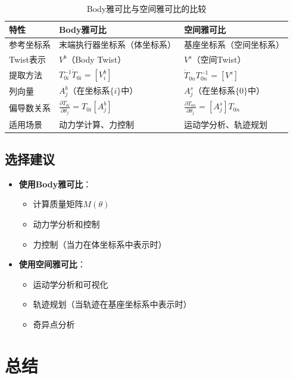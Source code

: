 \documentclass[12pt,a4paper]{article}
\begin{document}
\begin{table}[h]
\centering
\begin{tabular}{|l|l|l|}
\hline
\textbf{特性} & \textbf{Body雅可比} & \textbf{空间雅可比} \\
\hline
参考坐标系 & 末端执行器坐标系（体坐标系） & 基座坐标系（空间坐标系） \\
\hline
Twist表示 & $V^b$（Body Twist） & $V^s$（空间Twist） \\
\hline
提取方法 & $T_{0i}^{-1}\dot{T}_{0i} = [V_i^b]$ & $\dot{T}_{0n} T_{0n}^{-1} = [V^s]$ \\
\hline
列向量 & $A_j^b$（在坐标系$\{i\}$中） & $A_j^s$（在坐标系$\{0\}$中） \\
\hline
偏导数关系 & $\frac{\partial T_{0i}}{\partial \theta_j} = T_{0i} [A_j^b]$ & $\frac{\partial T_{0n}}{\partial \theta_j} = [A_j^s] T_{0n}$ \\
\hline
适用场景 & 动力学计算、力控制 & 运动学分析、轨迹规划 \\
\hline
\end{tabular}
\caption{Body雅可比与空间雅可比的比较}
\label{tab:comparison}
\end{table}

\subsection{选择建议}

\begin{itemize}
\item \textbf{使用Body雅可比}：
\begin{itemize}
\item 计算质量矩阵$M(\theta)$
\item 动力学分析和控制
\item 力控制（当力在体坐标系中表示时）
\end{itemize}

\item \textbf{使用空间雅可比}：
\begin{itemize}
\item 运动学分析和可视化
\item 轨迹规划（当轨迹在基座坐标系中表示时）
\item 奇异点分析
\end{itemize}
\end{itemize}

\section{总结}
\end{document}
